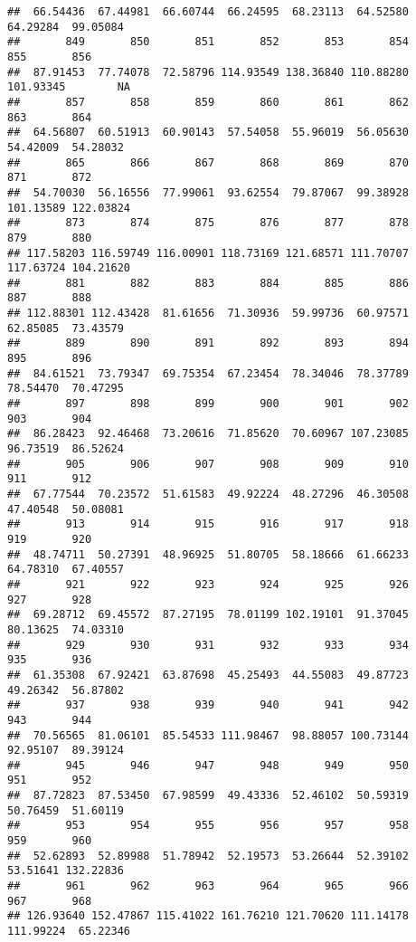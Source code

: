 \documentclass[
]{article}
\begin{document}
\begin{verbatim}
##  66.54436  67.44981  66.60744  66.24595  68.23113  64.52580  64.29284  99.05084 
##       849       850       851       852       853       854       855       856 
##  87.91453  77.74078  72.58796 114.93549 138.36840 110.88280 101.93345        NA 
##       857       858       859       860       861       862       863       864 
##  64.56807  60.51913  60.90143  57.54058  55.96019  56.05630  54.42009  54.28032 
##       865       866       867       868       869       870       871       872 
##  54.70030  56.16556  77.99061  93.62554  79.87067  99.38928 101.13589 122.03824 
##       873       874       875       876       877       878       879       880 
## 117.58203 116.59749 116.00901 118.73169 121.68571 111.70707 117.63724 104.21620 
##       881       882       883       884       885       886       887       888 
## 112.88301 112.43428  81.61656  71.30936  59.99736  60.97571  62.85085  73.43579 
##       889       890       891       892       893       894       895       896 
##  84.61521  73.79347  69.75354  67.23454  78.34046  78.37789  78.54470  70.47295 
##       897       898       899       900       901       902       903       904 
##  86.28423  92.46468  73.20616  71.85620  70.60967 107.23085  96.73519  86.52624 
##       905       906       907       908       909       910       911       912 
##  67.77544  70.23572  51.61583  49.92224  48.27296  46.30508  47.40548  50.08081 
##       913       914       915       916       917       918       919       920 
##  48.74711  50.27391  48.96925  51.80705  58.18666  61.66233  64.78310  67.40557 
##       921       922       923       924       925       926       927       928 
##  69.28712  69.45572  87.27195  78.01199 102.19101  91.37045  80.13625  74.03310 
##       929       930       931       932       933       934       935       936 
##  61.35308  67.92421  63.87698  45.25493  44.55083  49.87723  49.26342  56.87802 
##       937       938       939       940       941       942       943       944 
##  70.56565  81.06101  85.54533 111.98467  98.88057 100.73144  92.95107  89.39124 
##       945       946       947       948       949       950       951       952 
##  87.72823  87.53450  67.98599  49.43336  52.46102  50.59319  50.76459  51.60119 
##       953       954       955       956       957       958       959       960 
##  52.62893  52.89988  51.78942  52.19573  53.26644  52.39102  53.51641 132.22836 
##       961       962       963       964       965       966       967       968 
## 126.93640 152.47867 115.41022 161.76210 121.70620 111.14178 111.99224  65.22346 

\end{verbatim}
\end{document}
